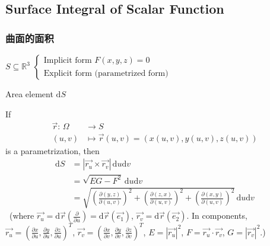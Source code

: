 
\subsection[数量场在曲面上的积分]{Surface Integral of Scalar Function}

\subsubsection{曲面的面积}

$S\subseteq\mathbb{R}^3$ $\begin{cases}
        \text{Implicit form }F(x,y,z)=0 \\
        \text{Explicit form (parametrized form)}
    \end{cases}$

Area element $\mathrm{d}S$

If
\begin{align*}
    \overrightarrow{r}:\,\Omega & \to S                                                 \\
    (u,v)                       & \mapsto\overrightarrow{r}(u,v)=(x(u,v),y(u,v),z(u,v))
\end{align*}
is a parametrization, then
\begin{align*}
    \mathrm{d}S
     & =\left|\overrightarrow{r_u}\times\overrightarrow{r_v}\right|\,\mathrm{d}u\mathrm{d}v                                                                                                     \\
     & =\sqrt{EG-F^2}\,\mathrm{d}u\mathrm{d}v                                                                                                                                                   \\
     & =\sqrt{\left(\frac{\partial(y,z)}{\partial(u,v)}\right)^2+\left(\frac{\partial(z,x)}{\partial(u,v)}\right)^2+\left(\frac{\partial(x,y)}{\partial(u,v)}\right)^2}\,\mathrm{d}u\mathrm{d}v
\end{align*}\
(where $\overrightarrow{r_u}=\mathrm{d}\overrightarrow{r}\left(\frac{\partial}{\partial u}\right)=\mathrm{d}\overrightarrow{r}\left(\overrightarrow{e_1}\right)$, $\overrightarrow{r_v}=\mathrm{d}\overrightarrow{r}\left(\overrightarrow{e_2}\right)$. In components, $\overrightarrow{r_u}=\left(\frac{\partial x}{\partial u},\frac{\partial y}{\partial u},\frac{\partial z}{\partial u}\right)^T$, $\overrightarrow{r_v}=\left(\frac{\partial x}{\partial v},\frac{\partial y}{\partial v},\frac{\partial z}{\partial v}\right)^T$, $E=\left|\overrightarrow{r_u}\right|^2$, $F=\overrightarrow{r_u}\cdot\overrightarrow{r_v}$, $G=\left|\overrightarrow{r_v}\right|^2$.)



